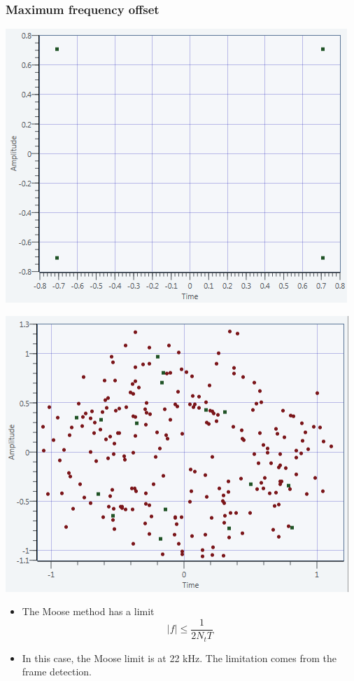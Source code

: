 \documentclass[11pt]{beamer}
\begin{document}
\begin{frame}
\frametitle{Maximum frequency offset}
\begin{minipage}[b]{0.48\linewidth}
        \centering \includegraphics[scale=0.37]{img/Moose_Limit_10k.png}
    \end{minipage}\hfill
    \begin{minipage}[b]{0.48\linewidth}
         \centering \includegraphics[scale=0.37]{img/Moose_Limit_12k.png}
    \end{minipage}
\begin{itemize}
\item The Moose method has a limit 
\begin{equation}
|f| \leq \frac{1}{2N_tT}
\end{equation}
\item In this case, the Moose limit is at 22 kHz. The limitation comes from the frame detection.
\end{itemize}
\end{frame}
\end{document}
